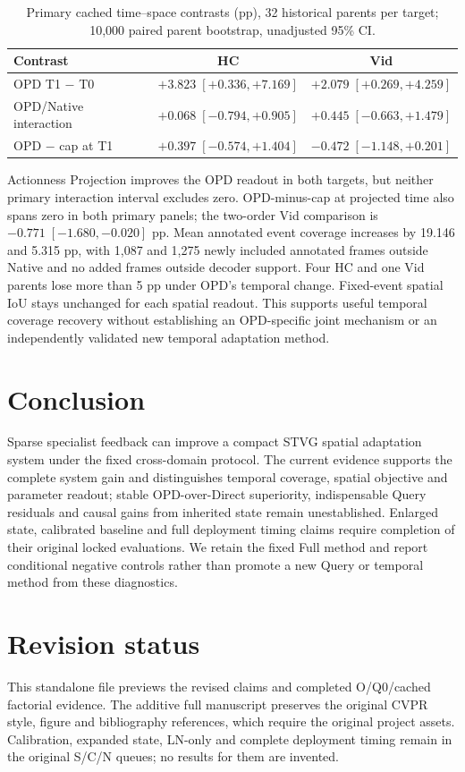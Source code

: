 \documentclass[11pt]{article}
\begin{document}
\begin{table}[t]
\centering\small
\caption{Primary cached time--space contrasts (pp), 32 historical parents per target; 10,000 paired parent bootstrap, unadjusted 95\% CI.}\label{tab:time-space}
\begin{tabular}{lcc}\toprule
Contrast & HC & Vid \\
\midrule
OPD T1 $-$ T0 & $+3.823\;[+0.336,+7.169]$ & $+2.079\;[+0.269,+4.259]$ \\
OPD/Native interaction & $+0.068\;[-0.794,+0.905]$ & $+0.445\;[-0.663,+1.479]$ \\
OPD $-$ cap at T1 & $+0.397\;[-0.574,+1.404]$ & $-0.472\;[-1.148,+0.201]$ \\
\bottomrule\end{tabular}\end{table}
Actionness Projection improves the OPD readout in both targets, but neither
primary interaction interval excludes zero. OPD-minus-cap at projected time
also spans zero in both primary panels; the two-order Vid comparison is
$-0.771\;[-1.680,-0.020]$ pp. Mean annotated event coverage increases by
19.146 and 5.315 pp, with 1,087 and 1,275 newly included annotated frames
outside Native and no added frames outside decoder support. Four HC and one
Vid parents lose more than 5 pp under OPD's temporal change. Fixed-event
spatial IoU stays unchanged for each spatial readout. This supports useful
temporal coverage recovery without establishing an OPD-specific joint
mechanism or an independently validated new temporal adaptation method.

\section{Conclusion}
Sparse specialist feedback can improve a compact STVG spatial adaptation
system under the fixed cross-domain protocol. The current evidence supports
the complete system gain and distinguishes temporal coverage, spatial
objective and parameter readout; stable OPD-over-Direct superiority,
indispensable Query residuals and causal gains from inherited state remain
unestablished. Enlarged state, calibrated baseline and full deployment timing
claims require completion of their original locked evaluations. We retain the
fixed Full method and report conditional negative controls rather than
promote a new Query or temporal method from these diagnostics.


\section{Revision status}
This standalone file previews the revised claims and completed O/Q0/cached
factorial evidence. The additive full manuscript preserves the original
CVPR style, figure and bibliography references, which require the original
project assets. Calibration, expanded state, LN-only and complete deployment
timing remain in the original S/C/N queues; no results for them are invented.
\end{document}
